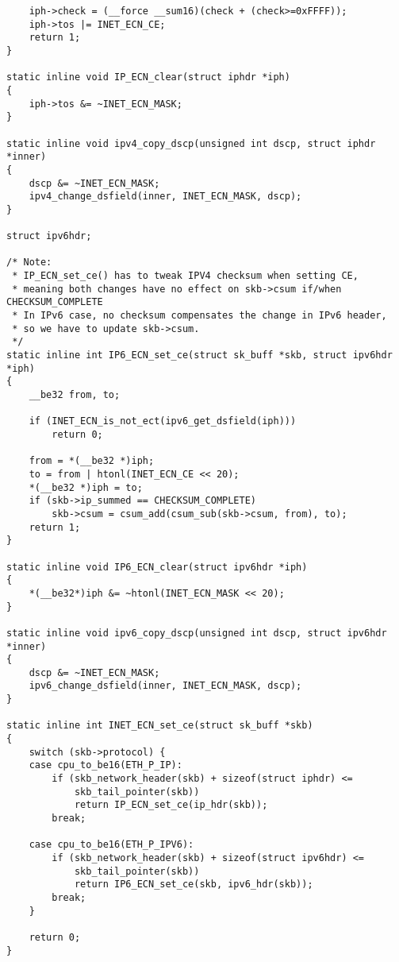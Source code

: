 \begin{verbatim}
	iph->check = (__force __sum16)(check + (check>=0xFFFF));
	iph->tos |= INET_ECN_CE;
	return 1;
}

static inline void IP_ECN_clear(struct iphdr *iph)
{
	iph->tos &= ~INET_ECN_MASK;
}

static inline void ipv4_copy_dscp(unsigned int dscp, struct iphdr *inner)
{
	dscp &= ~INET_ECN_MASK;
	ipv4_change_dsfield(inner, INET_ECN_MASK, dscp);
}

struct ipv6hdr;

/* Note:
 * IP_ECN_set_ce() has to tweak IPV4 checksum when setting CE,
 * meaning both changes have no effect on skb->csum if/when CHECKSUM_COMPLETE
 * In IPv6 case, no checksum compensates the change in IPv6 header,
 * so we have to update skb->csum.
 */
static inline int IP6_ECN_set_ce(struct sk_buff *skb, struct ipv6hdr *iph)
{
	__be32 from, to;

	if (INET_ECN_is_not_ect(ipv6_get_dsfield(iph)))
		return 0;

	from = *(__be32 *)iph;
	to = from | htonl(INET_ECN_CE << 20);
	*(__be32 *)iph = to;
	if (skb->ip_summed == CHECKSUM_COMPLETE)
		skb->csum = csum_add(csum_sub(skb->csum, from), to);
	return 1;
}

static inline void IP6_ECN_clear(struct ipv6hdr *iph)
{
	*(__be32*)iph &= ~htonl(INET_ECN_MASK << 20);
}

static inline void ipv6_copy_dscp(unsigned int dscp, struct ipv6hdr *inner)
{
	dscp &= ~INET_ECN_MASK;
	ipv6_change_dsfield(inner, INET_ECN_MASK, dscp);
}

static inline int INET_ECN_set_ce(struct sk_buff *skb)
{
	switch (skb->protocol) {
	case cpu_to_be16(ETH_P_IP):
		if (skb_network_header(skb) + sizeof(struct iphdr) <=
		    skb_tail_pointer(skb))
			return IP_ECN_set_ce(ip_hdr(skb));
		break;

	case cpu_to_be16(ETH_P_IPV6):
		if (skb_network_header(skb) + sizeof(struct ipv6hdr) <=
		    skb_tail_pointer(skb))
			return IP6_ECN_set_ce(skb, ipv6_hdr(skb));
		break;
	}

	return 0;
}


\end{verbatim}
